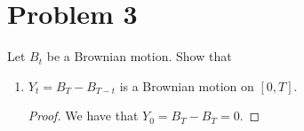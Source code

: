 \documentclass[11pt,letterpaper]{report}
\begin{document}
\section*{Problem 3}
Let $B_t$ be a Brownian motion. Show that
\begin{enumerate}[(a.)]
	\item $Y_t = B_T - B_{T-t}$ is a Brownian motion on $[0,T]$.
	\begin{proof}
		We have that $Y_0 = B_T - B_T = 0$. 
	\end{proof}
\end{enumerate}
\end{document}

